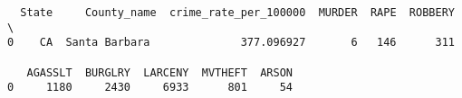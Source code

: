 \documentclass[11pt]{article}
\begin{document}
    
    \begin{verbatim}
  State     County_name  crime_rate_per_100000  MURDER  RAPE  ROBBERY  \
0    CA  Santa Barbara              377.096927       6   146      311   

   AGASSLT  BURGLRY  LARCENY  MVTHEFT  ARSON  
0     1180     2430     6933      801     54  
    \end{verbatim}

    
    \begin{Verbatim}[commandchars=\\\{\}]




    \end{Verbatim}

    \begin{center}
    \end{center}
    { \hspace*{\fill} \\}
    

    
    
    
    
\end{document}
